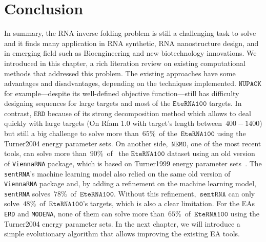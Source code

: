 \section{Conclusion}
In summary, the RNA inverse folding problem is still a challenging task to solve and it finds many application in RNA synthetic, RNA nanostructure design, and in emerging field such as Bioengineering and new biotechnology innovations. We introduced in this chapter, a rich literation review on existing computational methods that addressed this problem. The existing approaches have some advantages and disadvantages, depending on the techniques implemented. \(\texttt{NUPACK}\) for example---despite its well-defined objective function---still has difficulty designing sequences for large targets and most of the \(\texttt{EteRNA100}\) targets. In contrast, \(\texttt{ERD}\) because of its strong decomposition method which allows to deal quickly with large targets (On Rfam 1.0 with target's length between~\(400-1400\)) but still a big challenge to solve more than~\(65\%\)~of the~\(\texttt{EteRNA100}\) using the Turner2004 energy parameter sets. On another side,~\(\texttt{NEMO}\), one of the most recent tools, can solve more than~\(90\%\)~of~ the \(\texttt{EteRNA100}\) dataset using an old version of \texttt{ViennaRNA} package, which is based on Turner1999 energy parameter sets~\cite{Turn1999}. The \texttt{sentRNA}'s machine learning model also relied on the same old version of \texttt{ViennaRNA} package and, by adding a refinement on the machine learning model, \texttt{sentRNA} solves~\(78\%\)~of~\(\texttt{EteRNA100}\). Without this refinement,~\(\texttt{sentRNA}\) can only solve~\(48\%\)~of~\(\texttt{EteRNA100}\)'s targets, which is also a clear limitation. For the EAs \texttt{ERD} and \texttt{MODENA}, none of them can solve more than~\(65\%\)~of~\(\texttt{EteRNA100}\) using the Turner2004 energy parameter sets.  In the next chapter, we will introduce a simple evolutionary algorithm that allows improving the existing EA tools.
